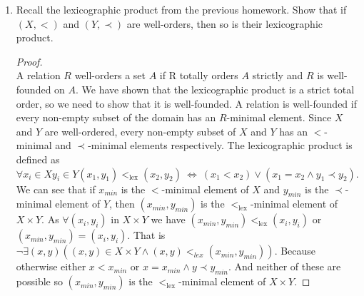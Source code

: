 \documentclass[11pt]{amsart}
\begin{document}
\begin{enumerate}
\item Recall the lexicographic product from the previous homework. Show that if $(X, <)$ and $(Y, \prec)$ are well-orders, then so is their lexicographic product.

\vspace{1em}
\begin{proof}
 \ \\
A relation $R$ well-orders a set $A$ if R totally orders $A$ strictly and $R$ is well-founded on $A$.
We have shown that the lexicographic product is a strict total order, so we need to show that it is well-founded.
A relation is well-founded if every non-empty subset of the domain has an $R$-minimal element.
Since $X$ and $Y$ are well-ordered, every non-empty subset of $X$ and $Y$ has an $<$-minimal and $\prec$-minimal elements respectively.
The lexicographic product is defined as $\forall x_i \in X y_i \in Y (x_1,y_1) <_{\text{lex}} (x_2,y_2) \ \Leftrightarrow\ (x_1<x_2) \vee (x_1=x_2 \wedge y_1 \prec y_2)$.
We can see that if $x_{min}$ is the $<$-minimal element of $X$ and $y_{min}$ is the $\prec$-minimal element of $Y$, then $(x_{min},y_{min})$ is the $<_{\text{lex}}$-minimal element of $X \times Y$.
As $\forall (x_i,y_i)$ in $X \times Y$ we have $(x_{min},y_{min}) <_{\text{lex}} (x_i,y_i)$ or $(x_{min},y_{min}) = (x_i,y_i)$.
That is $\neg \exists (x,y) ((x,y) \in X \times Y \wedge (x,y)<_{lex} (x_{min},y_{min}))$.
Because otherwise either $x < x_{min}$ or $x = x_{min} \wedge y \prec y_{min}$.
And neither of these are possible so $(x_{min},y_{min})$ is the $<_{\text{lex}}$-minimal element of $X \times Y$.
\end{proof}
\end{enumerate}
\end{document}
